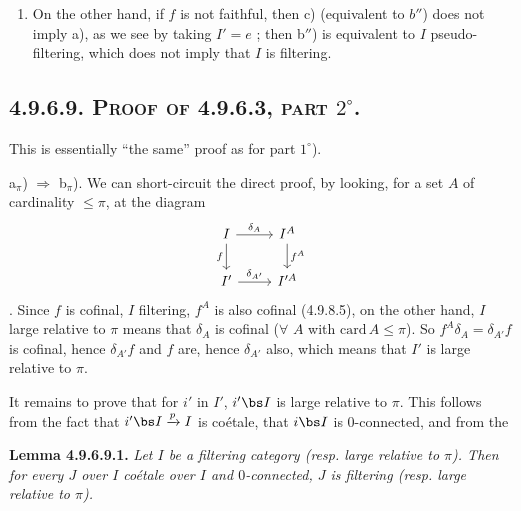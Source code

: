 \begin{enumerate}[label=\arabic*$^\circ$)]
\item On the other hand, if $f$ is not faithful, then c) (equivalent to $b''$) does not imply a), as we see by taking $I' = e$ ; then b$''$) is equivalent to $I$ pseudo-filtering, which does not imply that $I$ is filtering.
\end{enumerate}

\subsection*{\textbf{4.9.6.9.} \textsc{Proof of 4.9.6.3, part} $2^\circ$.}

This is essentially ``the same'' proof as for part $1^\circ$).

a$_\pi$) $\Longrightarrow$ b$_\pi$). We can short-circuit the direct proof, by looking, for a set $A$ of cardinality $\leqslant \pi$, at the diagram
\[
\begin{tikzcd}
I \arrow[r, "\delta_A"] \arrow[d, "f"'] & I^A \arrow[d, "f^A"] \\
I' \arrow[r, "\delta_{A'}"] & I'^A
\end{tikzcd}
\]
. Since $f$ is cofinal, $I$ filtering, $f^A$ is also cofinal (4.9.8.5), on the other hand, $I$ large relative to $\pi$ means that $\delta_A$ is cofinal ($\forall$ $A$ with $\mathrm{card}\, A \leqslant \pi$). So $f^A\delta_A = \delta_{A'}f$ is cofinal, hence $\delta_{A'}f$ and $f$ are, hence $\delta_{A'}$ also, which means that $I'$ is large relative to $\pi$.

It remains to prove that for $i'$ in $I'$, $i'\bs I$ is large relative to $\pi$. This follows from the fact that $i'\bs I \xrightarrow{p} I$ is coétale, that $i\bs I$ is 0-connected, and from the

\textbf{Lemma 4.9.6.9.1.} \textit{Let $I$ be a filtering category (resp. large relative to $\pi$). Then for every $J$ over $I$ coétale over $I$ and $0$-connected, $J$ is filtering (resp. large relative to $\pi$).}
